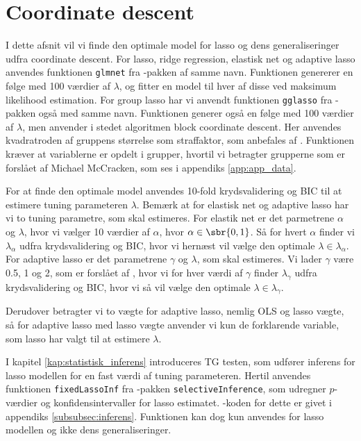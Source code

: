 \section{Coordinate descent}
I dette afsnit vil vi finde den optimale model for lasso og dens generaliseringer udfra coordinate descent.
For lasso, ridge regression, elastisk net og adaptive lasso anvendes funktionen \texttt{glmnet} fra \Rlang-pakken af samme navn.
Funktionen genererer en følge med 100 værdier af $\lambda$, og fitter en model til hver af disse ved maksimum likelihood estimation.
For group lasso har vi anvendt funktionen \texttt{gglasso} fra \Rlang-pakken også med samme navn. 
Funktionen generer også en følge med 100 værdier af $\lambda$, men anvender i stedet algoritmen block coordinate descent. Her anvendes kvadratroden af gruppens størrelse som straffaktor, som anbefales af \citep{group_lasso}.
Funktionen kræver at variablerne er opdelt i grupper, hvortil vi betragter grupperne som er forslået af Michael McCracken, som ses i appendiks \ref{app:app_data}. 

For at finde den optimale model anvendes 10-fold krydsvalidering og BIC til at estimere tuning parameteren $\lambda$.
Bemærk at for elastisk net og adaptive lasso har vi to tuning parametre, som skal estimeres. 
For elastik net er det parmetrene $\alpha$ og $\lambda$, hvor vi vælger 10 værdier af \(\alpha\), hvor $\alpha \in \sbr{0,1}$.  Så for hvert  \(\alpha\) finder vi \(\lambda_\alpha\) udfra krydsvalidering og BIC, hvor vi hernæst vil vælge den optimale $\lambda \in \lambda_{\alpha}$.  
For adaptive lasso er det parametrene $\gamma$ og $\lambda$, som skal estimeres.
Vi lader $\gamma$ være 0.5, 1 og 2, som er forslået af \citep{adaptive_lasso}, hvor vi for hver værdi af $\gamma$ finder \(\lambda_\gamma\) udfra krydsvalidering og BIC, hvor vi så vil vælge den optimale $\lambda \in \lambda_\gamma$.

Derudover betragter vi to vægte for adaptive lasso, nemlig OLS og lasso vægte, så for adaptive lasso med lasso vægte anvender vi kun de forklarende variable, som lasso har valgt til at estimere $\lambda$. 

I kapitel \ref{kap:statistisk_inferens} introduceres TG testen, som udfører inferens for lasso modellen for en fast værdi af tuning parameteren.
Hertil anvendes funktionen \texttt{fixedLassoInf} fra \Rlang-pakken \texttt{selectiveInference}, som udregner \(p\)-værdier og konfidensintervaller for lasso estimatet.
\Rlang-koden for dette er givet i appendiks \ref{subsubsec:inferens}.
Funktionen kan dog kun anvendes for lasso modellen og ikke dens generaliseringer. 






